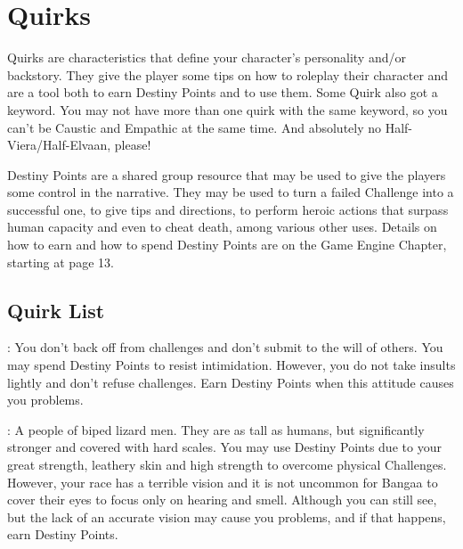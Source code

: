 \label{ch:characters}
\section{Quirks}
\label{sec:quirks}
\begin{multicols}{2}
\begin{ffcolpage}
Quirks are characteristics that define your character's personality and/or backstory. They give the player some tips on how to roleplay their character and are a tool both to earn Destiny Points and to use them. Some Quirk also got a keyword. You may not have more than one quirk with the same keyword, so you can't be Caustic and Empathic at the same time. And absolutely no Half-Viera/Half-Elvaan, please! \pc

Destiny Points are a shared group resource that may be used to give the players some control in the narrative. They may be used to turn a failed Challenge into a successful one, to give tips and directions, to perform heroic actions that surpass human capacity and even to cheat death, among various other uses. Details on how to earn and how to spend Destiny Points are on the Game Engine Chapter, starting at page 13.
\end{ffcolpage}

\subsection{Quirk List}
\label{subsec:quirklist}

\begin{ffcolpage}
: You don’t back off from challenges and don’t submit to the will of others. You may spend Destiny Points to resist intimidation. However, you do not take insults lightly and don’t refuse challenges. Earn Destiny Points when this attitude causes you problems.
\end{ffcolpage} \pw

\noindent{}
\begin{minipage}{.35\textwidth-2\columnsep}
: A people of biped lizard men. They are as tall as humans, but significantly stronger and covered with hard scales. You may use Destiny Points due to your great strength, leathery skin and high strength to overcome physical Challenges. However, your race has a terrible vision and it is not uncommon for Bangaa to cover their eyes to focus only on hearing and smell. Although you can still see, but the lack of an accurate vision may cause you problems, and if that happens, earn Destiny Points.
\end{minipage} \pw


\end{multicols}
